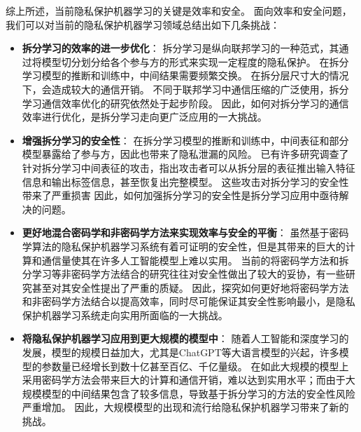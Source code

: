 综上所述，当前隐私保护机器学习的关键是效率和安全。
面向效率和安全问题，我们可以对当前的隐私保护机器学习领域总结出如下几条挑战：
\begin{itemize}
    \item \textbf{拆分学习的效率的进一步优化}：
    拆分学习是纵向联邦学习的一种范式，其通过将模型切分划分给各个参与方的形式来实现一定程度的隐私保护。
    在拆分学习模型的推断和训练中，中间结果需要频繁交换。
    在拆分层尺寸大的情况下，会造成较大的通信开销。
    不同于联邦学习中通信压缩的广泛使用，拆分学习通信效率优化的研究依然处于起步阶段。
    因此，如何对拆分学习的通信效率进行优化，是拆分学习走向更广泛应用的一大挑战。

    \item \textbf{增强拆分学习的安全性}：
    在拆分学习模型的推断和训练中，中间表征和部分模型暴露给了参与方，因此也带来了隐私泄漏的风险。
    已有许多研究调查了针对拆分学习中间表征的攻击，指出攻击者可以从拆分层的表征推出输入特征信息和输出标签信息，甚至恢复出完整模型。
    这些攻击对拆分学习的安全性带来了严重损害
    因此，如何加强拆分学习的安全性是拆分学习应用中亟待解决的问题。

    \item \textbf{更好地混合密码学和非密码学方法来实现效率与安全的平衡}：
    虽然基于密码学算法的隐私保护机器学习系统有着可证明的安全性，但是其带来的巨大的计算和通信量使其在许多人工智能模型上难以实用。
    当前的将密码学方法和拆分学习等非密码学方法结合的研究往往对安全性做出了较大的妥协，有一些研究甚至对其安全性提出了严重的质疑。
    因此，探究如何更好地将密码学方法和非密码学方法结合以提高效率，同时尽可能保证其安全性影响最小，是隐私保护机器学习系统走向实用所面临的一大挑战。

    \item \textbf{将隐私保护机器学习应用到更大规模的模型中}：
    随着人工智能和深度学习的发展，模型的规模日益加大，尤其是ChatGPT等大语言模型的兴起，许多模型的参数量已经增长到数十亿甚至百亿、千亿量级。
    在如此大规模的模型上采用密码学方法会带来巨大的计算和通信开销，难以达到实用水平；而由于大规模模型的中间结果包含了较多信息，导致基于拆分学习的方法的安全性风险严重增加。
    因此，大规模模型的出现和流行给隐私保护机器学习带来了新的挑战。
\end{itemize}


